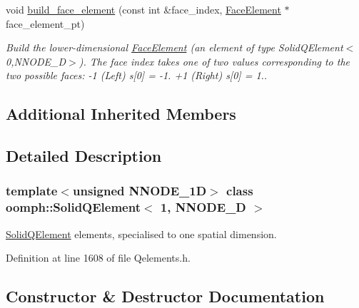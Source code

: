 \begin{DoxyCompactItemize}
void \hyperlink{classoomph_1_1SolidQElement_3_011_00_01NNODE__1D_01_4_ad641fb5cfe3c380c1d6e22f161b9f2b8}{build\+\_\+face\+\_\+element} (const int \&face\+\_\+index, \hyperlink{classoomph_1_1FaceElement}{Face\+Element} $\ast$face\+\_\+element\+\_\+pt)
\begin{DoxyCompactList}\small\item\em Build the lower-\/dimensional \hyperlink{classoomph_1_1FaceElement}{Face\+Element} (an element of type Solid\+Q\+Element$<$0,\+N\+N\+O\+D\+E\+\_\+D$>$). The face index takes one of two values corresponding to the two possible faces\+: -\/1 (Left) s\mbox{[}0\mbox{]} = -\/1. +1 (Right) s\mbox{[}0\mbox{]} = 1.. \end{DoxyCompactList}\end{DoxyCompactItemize}
\subsection*{Additional Inherited Members}


\subsection{Detailed Description}
\subsubsection*{template$<$unsigned N\+N\+O\+D\+E\+\_\+1D$>$\newline
class oomph\+::\+Solid\+Q\+Element$<$ 1, N\+N\+O\+D\+E\+\_\+D $>$}

\hyperlink{classoomph_1_1SolidQElement}{Solid\+Q\+Element} elements, specialised to one spatial dimension. 

Definition at line 1608 of file Qelements.\+h.



\subsection{Constructor \& Destructor Documentation}
\mbox{\label{classoomph_1_1SolidQElement_3_011_00_01NNODE__1D_01_4_a7dfe2bebc8306a8395c35dc890193215}} 
